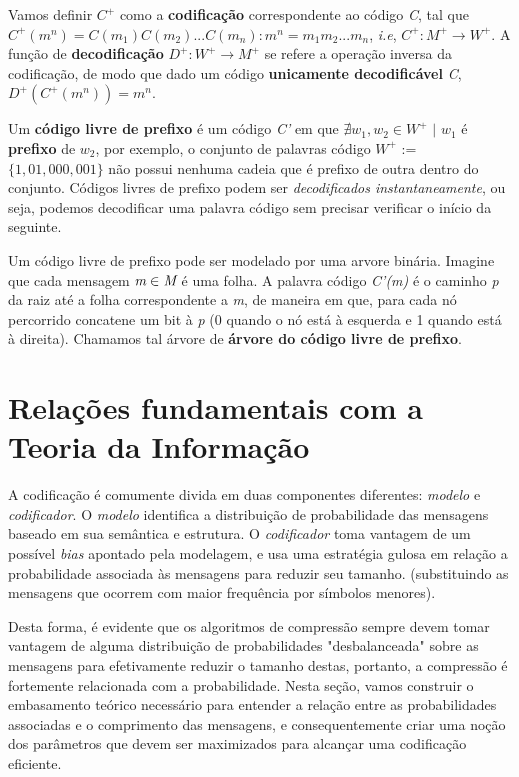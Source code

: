 Vamos definir \emph{$C^+$} como a \textbf{codificação} correspondente ao código \emph{C}, tal que $C^+(m^n) = C(m_1)C(m_2)...C(m_n) : m^n = m_1m_2...m_n$, \emph{i.e}, \emph{$C^+ : M^+ \rightarrow W^+$}. A função de \textbf{decodificação} \emph{$D^+ : W^+ \rightarrow M^+$} se refere a operação inversa da codificação, de modo que dado um código \textbf{unicamente decodificável} \emph{C}, $D^+(C^+(m^n)) = m^n$.

Um \textbf{código livre de prefixo} é um código \emph{C'} em que $\nexists w_1, w_2 \in W^+$ $|$ $w_1$ é \textbf{prefixo} de $w_2$, por exemplo, o conjunto de palavras código \emph{$W^+$} := $\{1, 01, 000, 001\}$ não possui nenhuma cadeia que é prefixo de outra dentro do conjunto. Códigos livres de prefixo podem ser \emph{decodificados instantaneamente}, ou seja, podemos decodificar uma palavra código sem precisar verificar o início da seguinte.

Um código livre de prefixo pode ser modelado por uma arvore binária. Imagine que cada mensagem $\emph{m} \in \emph{M}$ é uma folha. A palavra código \emph{C'(m)} é o caminho \emph{p} da raiz até a folha correspondente a \emph{m}, de maneira em que, para cada nó percorrido concatene um bit à \emph{p} (0 quando o nó está à esquerda e 1 quando está à direita). Chamamos tal árvore de \textbf{árvore do código livre de prefixo}.

\section{Relações fundamentais com a Teoria da Informação}
A codificação é comumente divida em duas componentes diferentes: \emph{modelo} e \emph{codificador}. O \emph{modelo} identifica a distribuição de probabilidade das mensagens baseado em sua semântica e estrutura. O \emph{codificador} toma vantagem de um possível \emph{bias} apontado pela modelagem, e usa uma estratégia gulosa em relação a probabilidade associada às mensagens para reduzir seu tamanho. (substituindo as mensagens que ocorrem com maior frequência por símbolos menores).

Desta forma, é evidente que os algoritmos de compressão sempre devem tomar vantagem de alguma distribuição de probabilidades "desbalanceada" sobre as mensagens para efetivamente reduzir o tamanho destas, portanto, a compressão é fortemente relacionada com a probabilidade. Nesta seção, vamos construir o embasamento teórico necessário para entender a relação entre as probabilidades associadas e o comprimento das mensagens, e consequentemente criar uma noção dos parâmetros que devem ser maximizados para alcançar uma codificação eficiente.

